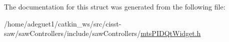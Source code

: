 The documentation for this struct was generated from the following file\-:\begin{DoxyCompactItemize}
\item 
/home/adeguet1/catkin\-\_\-ws/src/cisst-\/saw/saw\-Controllers/include/saw\-Controllers/\hyperlink{mts_p_i_d_qt_widget_8h}{mts\-P\-I\-D\-Qt\-Widget.\-h}\end{DoxyCompactItemize}
